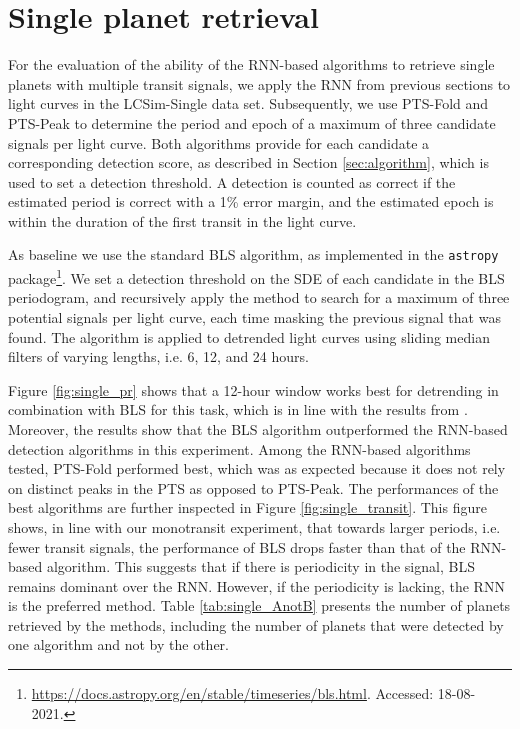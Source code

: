 \section{Single planet retrieval}
\label{sec:singles}

For the evaluation of the ability of the RNN-based algorithms to retrieve single planets with multiple transit signals, we apply the RNN from previous sections to light curves in the LCSim-Single data set. Subsequently, we use PTS-Fold and PTS-Peak to determine the period and epoch of a maximum of three candidate signals per light curve. Both algorithms provide for each candidate a corresponding detection score, as described in Section \ref{sec:algorithm}, which is used to set a detection threshold. A detection is counted as correct if the estimated period is correct with a 1\% error margin, and the estimated epoch is within the duration of the first transit in the light curve.

As baseline we use the standard BLS algorithm, as implemented in the \texttt{astropy} package\footnote{\url{https://docs.astropy.org/en/stable/timeseries/bls.html}. Accessed: 18-08-2021.}. We set a detection threshold on the SDE of each candidate in the BLS periodogram, and recursively apply the method to search for a maximum of three potential signals per light curve, each time masking the previous signal that was found. The algorithm is applied to detrended light curves using sliding median filters of varying lengths, i.e. 6, 12, and 24 hours.

Figure \ref{fig:single_pr} shows that a 12-hour window works best for detrending in combination with BLS for this task, which is in line with the results from \cite{hippke2019wotan}. Moreover, the results show that the BLS algorithm outperformed the RNN-based detection algorithms in this experiment. Among the RNN-based algorithms tested, PTS-Fold performed best, which was as expected because it does not rely on distinct peaks in the PTS as opposed to PTS-Peak. The performances of the best algorithms are further inspected in Figure \ref{fig:single_transit}. This figure shows, in line with our monotransit experiment, that towards larger periods, i.e. fewer transit signals, the performance of BLS drops faster than that of the RNN-based algorithm. This suggests that if there is periodicity in the signal, BLS remains dominant over the RNN. However, if the periodicity is lacking, the RNN is the preferred method. Table \ref{tab:single_AnotB} presents the number of planets retrieved by the methods, including the number of planets that were detected by one algorithm and not by the other.

